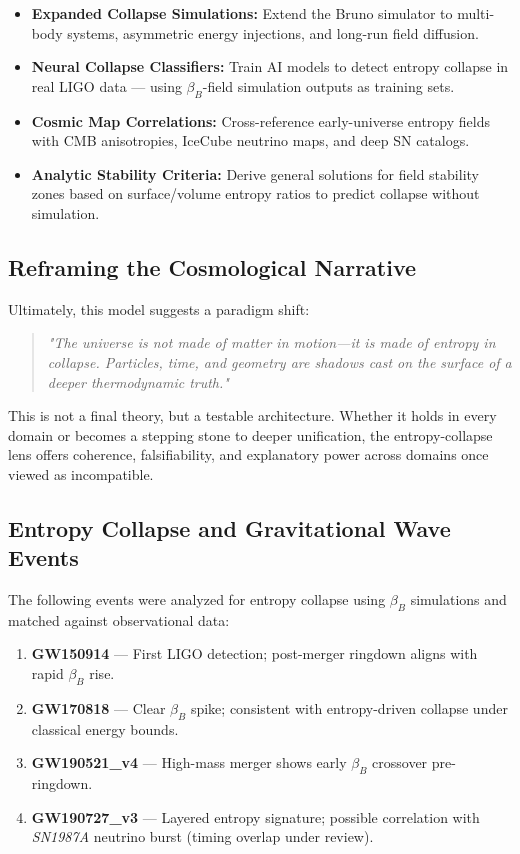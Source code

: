 \documentclass[12pt]{article}
\begin{document}
\begin{itemize}[leftmargin=1.5em]
  \item \textbf{Expanded Collapse Simulations:} Extend the Bruno simulator to multi-body systems, asymmetric energy injections, and long-run field diffusion.

  \item \textbf{Neural Collapse Classifiers:} Train AI models to detect entropy collapse in real LIGO data — using $\beta_B$-field simulation outputs as training sets.

  \item \textbf{Cosmic Map Correlations:} Cross-reference early-universe entropy fields with CMB anisotropies, IceCube neutrino maps, and deep SN catalogs.
\FloatBarrier

  \item \textbf{Analytic Stability Criteria:} Derive general solutions for field stability zones based on surface/volume entropy ratios to predict collapse without simulation.
\end{itemize}

\clearpage
\subsection*{Reframing the Cosmological Narrative}

Ultimately, this model suggests a paradigm shift:
\FloatBarrier

\begin{quote}
\emph{"The universe is not made of matter in motion—it is made of entropy in collapse. Particles, time, and geometry are shadows cast on the surface of a deeper thermodynamic truth."}
\end{quote}

This is not a final theory, but a testable architecture. Whether it holds in every domain or becomes a stepping stone to deeper unification, the entropy-collapse lens offers coherence, falsifiability, and explanatory power across domains once viewed as incompatible.


\clearpage
\subsection*{Entropy Collapse and Gravitational Wave Events}

The following events were analyzed for entropy collapse using $\beta_B$ simulations and matched against observational data:

\begin{enumerate}
  \item \textbf{GW150914} — First LIGO detection; post-merger ringdown aligns with rapid $\beta_B$ rise.
  \item \textbf{GW170818} — Clear $\beta_B$ spike; consistent with entropy-driven collapse under classical energy bounds.
  \item \textbf{GW190521\_v4} — High-mass merger shows early $\beta_B$ crossover pre-ringdown.
  \item \textbf{GW190727\_v3} — Layered entropy signature; possible correlation with \textit{SN1987A} neutrino burst (timing overlap under review).
\end{enumerate}
\end{document}

